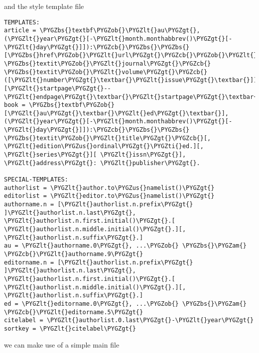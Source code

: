 \documentclass[letterpaper,10pt,english]{sphinxmanual}
\def\PYGZbs{\char`\\}
\def\PYGZus{\char`\_}
\def\PYGZob{\char`\{}
\def\PYGZcb{\char`\}}
\def\PYGZam{\char`\&}
\def\PYGZlt{\char`\<}
\def\PYGZgt{\char`\>}
\def\PYGZti{\char`\~}
\begin{document}
and the style template file

\begin{Verbatim}[commandchars=\\\{\}]
TEMPLATES:
article = \PYGZbs{}textbf\PYGZob{}\PYGZlt{}au\PYGZgt{}, (\PYGZlt{}year\PYGZgt{}[-\PYGZlt{}month.monthabbrev()\PYGZgt{}[-\PYGZlt{}day\PYGZgt{}]]):\PYGZcb{}\PYGZbs{}\PYGZbs{} [\PYGZbs{}href\PYGZob{}\PYGZlt{}url\PYGZgt{}\PYGZcb{}\PYGZob{}\PYGZlt{}title\PYGZgt{}\PYGZcb{}\textbar{}\PYGZbs{}href\PYGZob{}\PYGZlt{}doi\PYGZgt{}\PYGZcb{}\PYGZob{}\PYGZlt{}title\PYGZgt{}\PYGZcb{}\textbar{}\PYGZlt{}title\PYGZgt{}\textbar{}], \PYGZbs{}textit\PYGZob{}\PYGZlt{}journal\PYGZgt{}\PYGZcb{} \PYGZbs{}textit\PYGZob{}\PYGZlt{}volume\PYGZgt{}\PYGZcb{}([\PYGZlt{}number\PYGZgt{}\textbar{}\PYGZlt{}issue\PYGZgt{}\textbar{}]), [\PYGZlt{}startpage\PYGZgt{}--\PYGZlt{}endpage\PYGZgt{}\textbar{}\PYGZlt{}startpage\PYGZgt{}\textbar{}\PYGZlt{}eid\PYGZgt{}\textbar{}].
book = \PYGZbs{}textbf\PYGZob{}[\PYGZlt{}au\PYGZgt{}\textbar{}\PYGZlt{}ed\PYGZgt{}\textbar{}], (\PYGZlt{}year\PYGZgt{}[-\PYGZlt{}month.monthabbrev()\PYGZgt{}[-\PYGZlt{}day\PYGZgt{}]]):\PYGZcb{}\PYGZbs{}\PYGZbs{} \PYGZbs{}textit\PYGZob{}\PYGZlt{}title\PYGZgt{}\PYGZcb{}[, \PYGZlt{}edition\PYGZus{}ordinal\PYGZgt{}\PYGZti{}ed.][, \PYGZlt{}series\PYGZgt{}][ \PYGZlt{}issn\PYGZgt{}], \PYGZlt{}address\PYGZgt{}: \PYGZlt{}publisher\PYGZgt{}.

SPECIAL-TEMPLATES:
authorlist = \PYGZlt{}author.to\PYGZus{}namelist()\PYGZgt{}
editorlist = \PYGZlt{}editor.to\PYGZus{}namelist()\PYGZgt{}
authorname.n = [\PYGZlt{}authorlist.n.prefix\PYGZgt{} ]\PYGZlt{}authorlist.n.last\PYGZgt{}, \PYGZlt{}authorlist.n.first.initial()\PYGZgt{}.[ \PYGZlt{}authorlist.n.middle.initial()\PYGZgt{}.][, \PYGZlt{}authorlist.n.suffix\PYGZgt{}.]
au = \PYGZlt{}authorname.0\PYGZgt{}, ...\PYGZob{} \PYGZbs{}\PYGZam{} \PYGZcb{}\PYGZlt{}authorname.9\PYGZgt{}
editorname.n = [\PYGZlt{}authorlist.n.prefix\PYGZgt{} ]\PYGZlt{}authorlist.n.last\PYGZgt{}, \PYGZlt{}authorlist.n.first.initial()\PYGZgt{}.[ \PYGZlt{}authorlist.n.middle.initial()\PYGZgt{}.][, \PYGZlt{}authorlist.n.suffix\PYGZgt{}.]
ed = \PYGZlt{}editorname.0\PYGZgt{}, ...\PYGZob{} \PYGZbs{}\PYGZam{} \PYGZcb{}\PYGZlt{}editorname.5\PYGZgt{}
citelabel = \PYGZlt{}authorlist.0.last\PYGZgt{}-\PYGZlt{}year\PYGZgt{}
sortkey = \PYGZlt{}citelabel\PYGZgt{}
\end{Verbatim}

we can make use of a simple main  file
\end{document}
